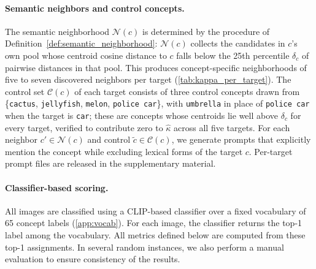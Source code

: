 \paragraph{Semantic neighbors and control concepts.}
The semantic neighborhood $\mathcal{N}(c)$ is determined by the procedure of Definition~\ref{def:semantic_neighborhood}: $\mathcal{N}(c)$ collects the candidates in $c$'s own pool whose centroid cosine distance to $c$ falls below the 25th percentile $\delta_c$ of pairwise distances in that pool. This produces concept-specific neighborhoods of five to seven discovered neighbors per target (\cref{tab:kappa_per_target}).
The control set $\mathcal{C}(c)$ of each target consists of three control concepts drawn from \{\texttt{cactus}, \texttt{jellyfish}, \texttt{melon}, \texttt{police car}\}, with \texttt{umbrella} in place of \texttt{police car} when the target is \texttt{car}; these are concepts whose centroids lie well above $\delta_c$ for every target, verified to contribute zero to $\hat\kappa$ across all five targets. For each neighbor $c' \in \mathcal{N}(c)$ and control $\tilde c \in \mathcal{C}(c)$, we generate prompts that explicitly mention the concept while excluding lexical forms of the target $c$. Per-target prompt files are released in the supplementary material.

\paragraph{Classifier-based scoring.}
All images are classified using a CLIP-based classifier over a fixed vocabulary of 65 concept labels (\cref{app:vocab}). For each image, the classifier returns the top-1 label among the vocabulary. All metrics defined below are computed from these top-1 assignments. In several random instances, we also perform a manual evaluation to ensure consistency of the results.


